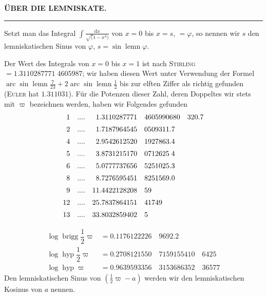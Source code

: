 \begingroup
\renewcommand{\arraystretch}{1.45}
\clearpage{}

\begin{center}
\textbf{ÜBER DIE LEMNISKATE.}\par\medskip
\rule{2cm}{0.3pt}
\end{center}

Setzt man das Integral $\int\frac{\mathrm{d}x}{\surd(1-x^4)}$ von $x=0$ bis $x=s$, $=\varphi$, so nennen wir $s$ den lemniskatischen Sinus von $\varphi$, $s=\sin\operatorname{lemn}\varphi$.

Der Wert des Integrals von $x=0$ bis $x=1$ ist nach \textsc{Stirling} $=1.3110287771\;4605987$; wir haben diesen Wert unter Verwendung der Formel $\operatorname{arc}\sin\operatorname{lemn}\frac{7}{23}+2\operatorname{arc}\sin\operatorname{lemn}\frac12$ bis zur elften Ziffer als richtig gefunden (\textsc{Euler} hat $1.311031$). Für die Potenzen dieser Zahl, deren Doppeltes wir stets mit $\varpi$ bezeichnen werden, haben wir Folgendes gefunden
\[
\begin{array}{r@{\quad}c@{\quad}r@{\quad}l@{\quad}l}
1& \mathord{.}\mathord{.}\mathord{.}\mathord{.} &1.3110287771&4605990680&320.7\\[5pt]
2& \mathord{.}\mathord{.}\mathord{.}\mathord{.} &1.7187964545&0509311.7&\\[5pt]
4& \mathord{.}\mathord{.}\mathord{.}\mathord{.} &2.9542612520&1927863.4&\\[5pt]
5& \mathord{.}\mathord{.}\mathord{.}\mathord{.} &3.8731215170&0712625\;4&\\[5pt]
6& \mathord{.}\mathord{.}\mathord{.}\mathord{.} &5.0777737656&5251025.3&\\[5pt]
8& \mathord{.}\mathord{.}\mathord{.}\mathord{.} &8.7276595451&8251569.0&\\[5pt]
9& \mathord{.}\mathord{.}\mathord{.}\mathord{.} &11.4422128208&59&\\[5pt]
12& \mathord{.}\mathord{.}\mathord{.}\mathord{.} &25.7837864151&41749&\\[5pt]
13& \mathord{.}\mathord{.}\mathord{.}\mathord{.} &33.8032859402&5&
\end{array}
\]


\[
\begin{aligned}
\operatorname{log}\operatorname{brigg}\dfrac12\varpi&=0.1176122226\quad9692.2\\[5pt]
\operatorname{log}\operatorname{hyp}\dfrac12\varpi&=0.2708121550\quad7159155410\quad6425\\[5pt]
\operatorname{log}\operatorname{hyp}\varpi&=0.9639593356\quad3153686352\quad36577
\end{aligned}
\]
Den lemniskatischen Sinus von $(\tfrac12\varpi-a)$ werden wir den lemniskatischen Kosinus von $a$ nennen.

